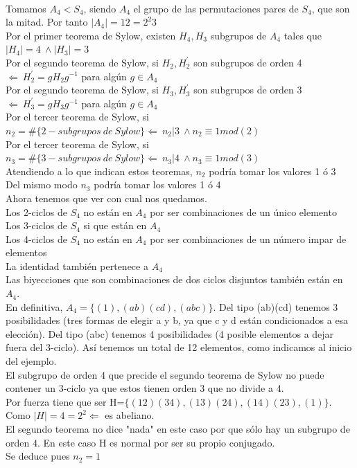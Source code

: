 \documentclass[nochap]{apuntes}
\begin{document}
\begin{example}
 \\Tomamos $A_4<S_4$, siendo $A_4$  el grupo de las permutaciones pares de $S_4$, que son la mitad. Por tanto $|A_4|=12=2^{2}3$\\
 Por el primer teorema de Sylow, existen $H_4, H_3$  subgrupos de $A_4$  tales que $|H_4|=4 \ \wedge |H_3|=3$\\
 Por el segundo teorema de Sylow, si $H_2, H_2^{'}$  son subgrupos de orden 4 $\Leftarrow \ H_2^{'}=gH_2g^{-1}$  para algún $g\in A_4$\\
 Por el segundo teorema de Sylow, si $H_3, H_3^{'}$  son subgrupos de orden 3 $\Leftarrow \ H_3^{'}=gH_3g^{-1}$  para algún $g\in A_4$\\
 Por el tercer teorema de Sylow, si $n_2=\#\{2-subgrupos \ de \ Sylow \} \Leftarrow \ n_2|3 \ \wedge n_2\equiv 1 mod(2)$\\
 Por el tercer teorema de Sylow, si $n_3=\#\{3-subgrupos \ de \ Sylow \} \Leftarrow \ n_3|4 \ \wedge n_3\equiv 1 mod(3)$\\
 Atendiendo a lo que indican estos teoremas, $n_2$  podría tomar los valores 1 ó 3\\
 Del mismo modo $n_3$  podría tomar los valores 1 ó 4\\
 Ahora tenemos que ver con cual nos quedamos.\\
 Los 2-ciclos de $S_4$  no están en $A_4$  por ser combinaciones de un único elemento\\
 Los 3-ciclos de $S_4$  si que están en $A_4$\\
 Los 4-ciclos de $S_4$  no están en $A_4$  por ser combinaciones de un número impar de elementos\\
 La identidad también pertenece a $A_4$\\
 Las biyecciones que son combinaciones de dos ciclos disjuntos también están en $A_4$.\\
 En definitiva, $A_4=\{(1), (ab)(cd), (abc)\}$. Del tipo (ab)(cd) tenemos 3 posibilidades (tres formas de elegir a y b, ya que c y d
 están condicionados a esa elección). Del tipo (abc) tenemos 4 posibilidades (4 posible elementos a dejar fuera del 3-ciclo). Así tenemos un
 total de 12 elementos, como indicamos al inicio del ejemplo.\\
 
 El subgrupo de orden 4 que precide el segundo teorema de Sylow no puede contener un 3-ciclo ya que estos tienen orden 3 que no divide
 a 4.\\
 Por fuerza tiene que ser H=$\{(12)(34), (13)(24), (14)(23), (1)\}$. Como $|H|=4=2^{2} \Leftarrow$  es abeliano.\\
 El segundo teorema no dice "nada" en este caso por que sólo hay un subgrupo de orden 4. En este caso H es normal por ser su propio
 conjugado.\\
 Se deduce pues $n_2=1$\\
 

\end{example}
\end{document}
